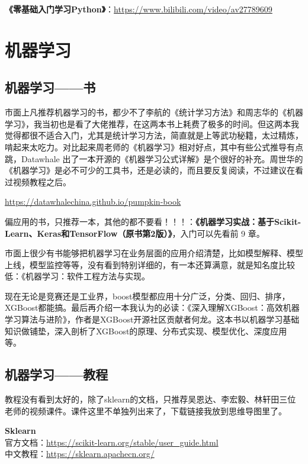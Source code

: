 \documentclass[]{ctexbook}
\begin{document}
\textbf{《零基础入门学习Python》}：\url{https://www.bilibili.com/video/av27789609}

\hypertarget{ux673aux5668ux5b66ux4e60}{%
\section{机器学习}\label{ux673aux5668ux5b66ux4e60}}

\hypertarget{ux673aux5668ux5b66ux4e60ux4e66}{%
\subsection{机器学习------书}\label{ux673aux5668ux5b66ux4e60ux4e66}}

市面上凡推荐机器学习的书，都少不了李航的《统计学习方法》和周志华的《机器学习》，我当初也是看了大佬推荐，在这两本书上耗费了极多的时间。但这两本我觉得都很不适合入门，尤其是统计学习方法，简直就是上等武功秘籍，太过精炼，啃起来太吃力。对比起来周老师的《机器学习》相对好点，其中有些公式推导有点跳，Datawhale 出了一本开源的《机器学习公式详解》是个很好的补充。周世华的《机器学习》是必不可少的工具书，还是必读的，而且要反复阅读，不过建议在看过视频教程之后。

\url{https://datawhalechina.github.io/pumpkin-book}

偏应用的书，只推荐一本，其他的都不要看！！！：\textbf{《机器学习实战：基于Scikit-Learn、Keras和TensorFlow（原书第2版）》}，入门可以先看前 9 章。

市面上很少有书能够把机器学习在业务层面的应用介绍清楚，比如模型解释、模型上线，模型监控等等，没有看到特别详细的，有一本还算满意，就是知名度比较低：《机器学习：软件工程方法与实现。

现在无论是竞赛还是工业界，boost模型都应用十分广泛，分类、回归、排序，XGBoost都能搞。最后再介绍一本我认为的必读：《深入理解XGBoost：高效机器学习算法与进阶》，作者是XGBoost开源社区贡献者何龙。这本书以机器学习基础知识做铺垫，深入剖析了XGBoost的原理、分布式实现、模型优化、深度应用等。

\hypertarget{ux673aux5668ux5b66ux4e60ux6559ux7a0b}{%
\subsection{机器学习------教程}\label{ux673aux5668ux5b66ux4e60ux6559ux7a0b}}

教程没有看到太好的，除了sklearn的文档，只推荐吴恩达、李宏毅、林轩田三位老师的视频课件。课件这里不单独列出来了，下载链接我放到思维导图里了。

\textbf{Sklearn}\\
官方文档：\url{https://scikit-learn.org/stable/user_guide.html}\\
中文教程：\url{https://sklearn.apachecn.org/}
\end{document}
